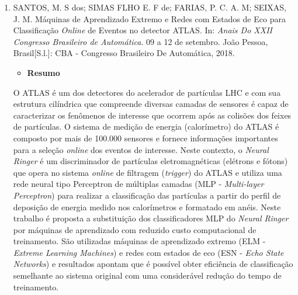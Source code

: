 \begin{apendicesenv}
\begin{enumerate}
	\item SANTOS, M. S dos; SIMAS FLHO E. F de; FARIAS, P. C. A. M; SEIXAS, J. M. Máquinas de Aprendizado Extremo e Redes com Estados de Eco para Classificação \textit{Online} de Eventos no detector ATLAS. In: \textit{Anais Do XXII Congresso Brasileiro de Automática}. 09 a 12 de setembro. João Pessoa, Brasil[S.l.]: CBA - Congresso Brasileiro De
	Automática, 2018.
	\begin{itemize}
		\item \textbf{Resumo}
	\end{itemize}
	O ATLAS é um dos detectores do acelerador de partículas LHC e com sua estrutura cilíndrica que compreende diversas camadas de sensores é capaz de caracterizar os fenômenos de interesse que ocorrem após as colisões dos feixes de partículas. O sistema de medição de energia (calorímetro) do ATLAS é composto por mais de 100.000 sensores e fornece informações importantes para a seleção \textit{online} dos eventos de interesse. Neste contexto, o \textit{Neural Ringer} é um discriminador de partículas eletromagnéticas (elétrons e fótons) que opera no sistema \textit{online} de filtragem (\textit{trigger}) do ATLAS e utiliza uma rede neural tipo Perceptron de múltiplas camadas (MLP - \textit{Multi-layer Perceptron}) para realizar a classificação das partículas a partir do perfil de deposição de energia medido nos calorímetros e formatado em anéis. Neste trabalho é proposta a substituição dos classificadores MLP do \textit{Neural Ringer} por máquinas de aprendizado com reduzido custo computacional de treinamento. São utilizadas máquinas de aprendizado extremo (ELM - \textit{Extreme Learning Machines}) e redes com estados de eco (ESN - \textit{Echo State Networks}) e resultados apontam que é possível obter eficiência de classificação semelhante ao sistema original com uma considerável redução do tempo de treinamento.
\end{enumerate}


\end{apendicesenv}

